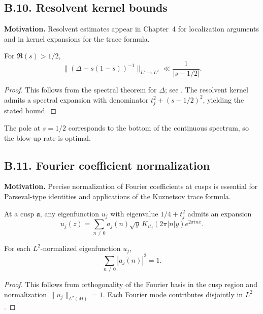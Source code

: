 \subsection*{B.10. Resolvent kernel bounds}

\noindent
\textbf{Motivation.}
Resolvent estimates appear in Chapter~4 for localization arguments and
in kernel expansions for the trace formula.

\begin{lemma}\label{lem:resolvent}
For $\Re(s)>1/2$,
\[
\big\| (\Delta - s(1-s))^{-1} \big\|_{L^2\to L^2} \ll \frac{1}{|s-1/2|}.
\]
\end{lemma}

\begin{proof}
This follows from the spectral theorem for $\Delta$; see \cite[Prop.~1.6]{Buser1992}.
The resolvent kernel admits a spectral expansion with denominator $t_j^2+(s-1/2)^2$,
yielding the stated bound.
\end{proof}

\begin{remark}[Sharpness]
The pole at $s=1/2$ corresponds to the bottom of the continuous spectrum,
so the blow-up rate is optimal.
\end{remark}

\subsection*{B.11. Fourier coefficient normalization}

\noindent
\textbf{Motivation.}
Precise normalization of Fourier coefficients at cusps is essential for Parseval-type
identities and applications of the Kuznetsov trace formula.

\begin{definition}
At a cusp $\mathfrak a$, any eigenfunction $u_j$ with eigenvalue $1/4+t_j^2$
admits an expansion
\[
u_j(z) = \sum_{n\ne 0} a_j(n) \sqrt{y}\, K_{it_j}(2\pi |n| y) e^{2\pi i n x}.
\]
\end{definition}

\begin{lemma}\label{lem:parseval}
For each $L^2$-normalized eigenfunction $u_j$,
\[
\sum_{n\ne 0} |a_j(n)|^2 = 1.
\]
\end{lemma}

\begin{proof}
This follows from orthogonality of the Fourier basis in the cusp region and
normalization $\|u_j\|_{L^2(M)}=1$. Each Fourier mode contributes disjointly
in $L^2$.
\end{proof}

